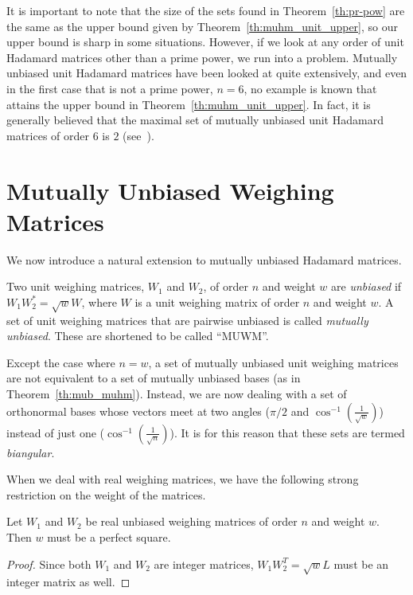 It is important to note that the size of the sets found in Theorem~\ref{th:pr-pow} are the same as the upper bound given by Theorem~\ref{th:muhm_unit_upper}, so our upper bound is sharp in some situations. However, if we look at any order of unit Hadamard matrices other than a prime power, we run into a problem. Mutually unbiased unit Hadamard matrices have been looked at quite extensively, and even in the first case that is not a prime power, $n = 6$, no example is known that attains the upper bound in Theorem~\ref{th:muhm_unit_upper}. In fact, it is generally believed that the maximal set of mutually unbiased unit Hadamard matrices of order $6$ is $2$ (see~\cite{mub-6}).

\section[Mutually Unbiased Weighing Matrices]{Mutually Unbiased Weighing Matrices}
\label{sec:muwm}

We now introduce a natural extension to mutually unbiased Hadamard matrices.

\begin{definition}
 Two unit weighing matrices, $W_1$ and $W_2$, of order $n$ and weight $w$ are {\it unbiased} if $W_1W_2^* = \sqrt{w}W$, where $W$ is a unit weighing matrix of order $n$ and weight $w$. A set of unit weighing matrices that are pairwise unbiased is called {\it mutually unbiased}. These are shortened to be called ``MUWM''.
\end{definition}

Except the case where $n = w$, a set of mutually unbiased unit weighing matrices are not equivalent to a set of mutually unbiased bases (as in Theorem~\ref{th:mub_muhm}). Instead, we are now dealing with a set of orthonormal bases whose vectors meet at two angles ($\pi/2$ and $\cos^{-1}(\frac{1}{\sqrt{w}})$) instead of just one ($\cos^{-1}(\frac{1}{\sqrt{n}})$). It is for this reason that these sets are termed {\it biangular}.

When we deal with real weighing matrices, we have the following strong restriction on the weight of the matrices.

\begin{lemma}\label{lem:perf-sqr}
 Let $W_1$ and $W_2$ be real unbiased weighing matrices of order $n$ and weight $w$. Then $w$ must be a perfect square.
 \begin{proof}
  Since both $W_1$ and $W_2$ are integer matrices, $W_1W_2^T=\sqrt{w}L$ must be an integer matrix as well.
 \end{proof}
\end{lemma}

